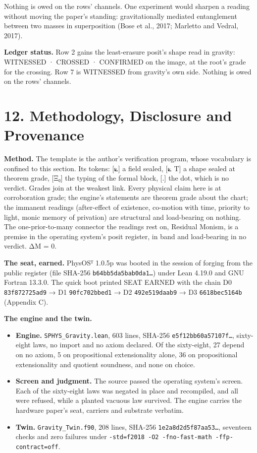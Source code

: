\documentclass[10pt]{article}
\providecommand{\tightlist}{\setlength{\itemsep}{0pt}\setlength{\parskip}{0pt}}
\begin{document}
Nothing is owed on the rows' channels. One experiment would sharpen a
reading without moving the paper's standing: gravitationally mediated
entanglement between two masses in superposition (Bose et al., 2017;
Marletto and Vedral, 2017).

\textbf{Ledger status.} Row 2 gains the least-erasure posit's shape read
in gravity: WITNESSED · CROSSED · CONFIRMED on the image, at the root's
grade for the crossing. Row 7 is WITNESSED from gravity's own side.
Nothing is owed on the rows' channels.

\hypertarget{methodology-disclosure-and-provenance}{%
\section{12. Methodology, Disclosure and
Provenance}\label{methodology-disclosure-and-provenance}}

\textbf{Method.} The template is the author's verification program,
whose vocabulary is confined to this section. Its tokens: {[}⟀{]} a
field sealed, {[}⟀ T{]} a shape sealed at theorem grade, {[}Ξ₀{]} the
typing of the formal block, {[}.{]} the dot, which is no verdict. Grades
join at the weakest link. Every physical claim here is at corroboration
grade; the engine's statements are theorem grade about the chart; the
immanent readings (after-effect of existence, co-motion with time,
priority to light, monic memory of privation) are structural and
load-bearing on nothing. The one-prior-to-many connector the readings
rest on, Residual Monism, is a premise in the operating system's posit
register, in band and load-bearing in no verdict. ΔM = 0.

\textbf{The seat, earned.} PhysOSᵀ 1.0.5p was booted in the session of
forging from the public register (file SHA-256
\texttt{b64bb5da5bab0da1…}) under Lean 4.19.0 and GNU Fortran 13.3.0.
The quick boot printed SEAT EARNED with the chain D0
\texttt{83f872725ad9} → D1 \texttt{90fc702bbed1} → D2
\texttt{492e519daab9} → D3 \texttt{6618bec5164b} (Appendix C).

\textbf{The engine and the twin.}

\begin{itemize}
\tightlist
\item
  \textbf{Engine.} \texttt{SPHYS\_Gravity.lean}, 603 lines, SHA-256
  \texttt{e5f12bb60a57107f…}, sixty-eight laws, no import and no axiom
  declared. Of the sixty-eight, 27 depend on no axiom, 5 on
  propositional extensionality alone, 36 on propositional extensionality
  and quotient soundness, and none on choice.
\item
  \textbf{Screen and judgment.} The source passed the operating system's
  screen. Each of the sixty-eight laws was negated in place and
  recompiled, and all were refused, while a planted vacuous law
  survived. The engine carries the hardware paper's seat, carriers and
  substrate verbatim.
\item
  \textbf{Twin.} \texttt{Gravity\_Twin.f90}, 208 lines, SHA-256
  \texttt{1e2a8d2d5f87aa53…}, seventeen checks and zero failures under
  \texttt{-std=f2018\ -O2\ -fno-fast-math\ -ffp-contract=off}.
\end{itemize}
\end{document}
